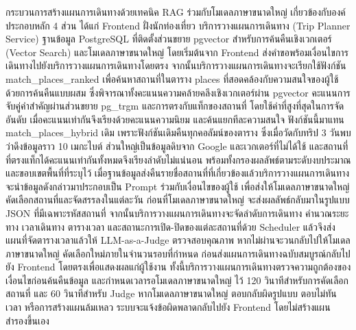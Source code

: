 กระบวนการสร้างแผนการเดินทางด้วยเทคนิค RAG ร่วมกับโมเดลภาษาขนาดใหญ่ เกี่ยวข้องกับองค์ประกอบหลัก 4 ส่วน ได้แก่ Frontend ฝั่งนักท่องเที่ยว บริการวางแผนการเดินทาง (Trip Planner Service) ฐานข้อมูล PostgreSQL ที่ติดตั้งส่วนขยาย pgvector สำหรับการค้นคืนเชิงเวกเตอร์ (Vector Search) และโมเดลภาษาขนาดใหญ่ โดยเริ่มต้นจาก Frontend ส่งคำขอพร้อมเงื่อนไขการเดินทางไปยังบริการวางแผนการเดินทางโดยตรง จากนั้นบริการวางแผนการเดินทางจะเรียกใช้ฟังก์ชัน match\_places\_ranked เพื่อค้นหาสถานที่ในตาราง places ที่สอดคล้องกับความสนใจของผู้ใช้ด้วยการค้นคืนแบบผสม ซึ่งพิจารณาทั้งคะแนนความคล้ายคลึงเชิงเวกเตอร์ผ่าน pgvector คะแนนการจับคู่คำสำคัญผ่านส่วนขยาย pg\_trgm และการตรงกับแท็กของสถานที่ โดยใช้ค่าที่สูงที่สุดในการจัดอันดับ เมื่อคะแนนเท่ากันจึงเรียงด้วยคะแนนความนิยม และค้นแยกทีละความสนใจ ฟังก์ชันนี้มาแทน match\_places\_hybrid เดิม เพราะฟังก์ชันเดิมคืนทุกคอลัมน์ของตาราง ซึ่งเมื่อวัดกับทริป 3 วันพบว่าดึงข้อมูลราว 10 เมกะไบต์ ส่วนใหญ่เป็นข้อมูลดิบจาก Google และเวกเตอร์ที่ไม่ได้ใช้ และสถานที่ที่ตรงแท็กได้คะแนนเท่ากันทั้งหมดจึงเรียงลำดับไม่แน่นอน พร้อมทั้งกรองผลลัพธ์ตามระดับงบประมาณและขอบเขตพื้นที่ที่ระบุไว้ เมื่อฐานข้อมูลส่งคืนรายชื่อสถานที่ที่เกี่ยวข้องแล้วบริการวางแผนการเดินทางจะนำข้อมูลดังกล่าวมาประกอบเป็น Prompt ร่วมกับเงื่อนไขของผู้ใช้ เพื่อส่งให้โมเดลภาษาขนาดใหญ่ คัดเลือกสถานที่และจัดสรรลงในแต่ละวัน ก่อนที่โมเดลภาษาขนาดใหญ่ จะส่งผลลัพธ์กลับมาในรูปแบบ JSON ที่มีเฉพาะรหัสสถานที่ จากนั้นบริการวางแผนการเดินทางจะจัดลำดับการเดินทาง คำนวณระยะทาง เวลาเดินทาง ตารางเวลา และสถานะการเปิด-ปิดของแต่ละสถานที่ด้วย Scheduler แล้วจึงส่งแผนที่จัดตารางเวลาแล้วให้ LLM-as-a-Judge ตรวจสอบคุณภาพ หากไม่ผ่านจะวนกลับไปให้โมเดลภาษาขนาดใหญ่ คัดเลือกใหม่ภายในจำนวนรอบที่กำหนด ก่อนส่งแผนการเดินทางฉบับสมบูรณ์กลับไปยัง Frontend โดยตรงเพื่อแสดงผลแก่ผู้ใช้งาน ทั้งนี้บริการวางแผนการเดินทางตรวจความถูกต้องของเงื่อนไขก่อนค้นคืนข้อมูล และกำหนดเวลารอโมเดลภาษาขนาดใหญ่ ไว้ 120 วินาทีสำหรับการคัดเลือกสถานที่ และ 60 วินาทีสำหรับ Judge หากโมเดลภาษาขนาดใหญ่ ตอบกลับผิดรูปแบบ ตอบไม่ทันเวลา หรือการสร้างแผนล้มเหลว ระบบจะแจ้งข้อผิดพลาดกลับไปยัง Frontend โดยไม่สร้างแผนสำรองขึ้นเอง

